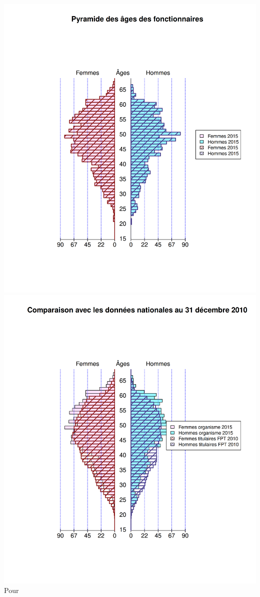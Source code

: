 \includegraphics{altair_files/figure-latex/unnamed-chunk-17-1.png}
\includegraphics{altair_files/figure-latex/unnamed-chunk-17-2.png} Pour
